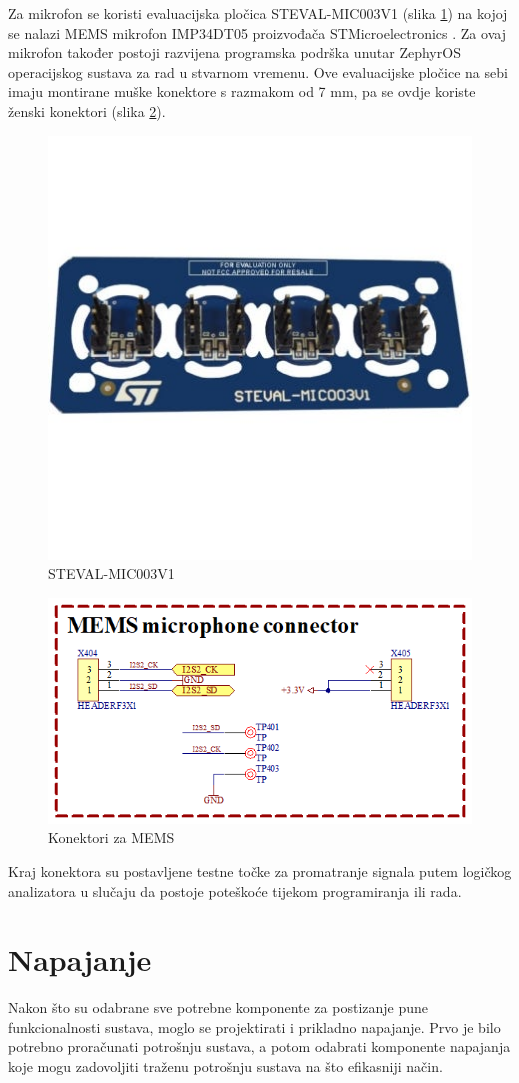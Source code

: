 Za mikrofon se koristi evaluacijska pločica STEVAL-MIC003V1 (slika \ref{slk:STEVAL}) na kojoj se nalazi MEMS mikrofon IMP34DT05 proizvođača STMicroelectronics \cite{stmicroelectronics:steval}. Za ovaj mikrofon također postoji razvijena programska podrška unutar ZephyrOS operacijskog sustava za rad u stvarnom vremenu. Ove evaluacijske pločice na sebi imaju montirane muške konektore s razmakom od 7 mm, pa se ovdje koriste ženski konektori (slika \ref{slk:MEMS}).
\begin{figure}[h!bt]
    \centering
    \includegraphics[width=6 cm]{Figures/STEVAL.jpg}
    \caption{STEVAL-MIC003V1}
    \label{slk:STEVAL}
\end{figure}
\begin{figure}[h!bt]
    \centering
    \includegraphics[width=6 cm]{Figures/MEMS.png}
    \caption{Konektori za MEMS}
    \label{slk:MEMS}
\end{figure}
Kraj konektora su postavljene testne točke za promatranje signala putem logičkog analizatora u slučaju da postoje poteškoće tijekom programiranja ili rada.

\section{Napajanje}
Nakon što su odabrane sve potrebne komponente za postizanje pune funkcionalnosti sustava, moglo se projektirati i prikladno napajanje. Prvo je bilo potrebno proračunati potrošnju sustava, a potom odabrati komponente napajanja koje mogu zadovoljiti traženu potrošnju sustava na što efikasniji način.

